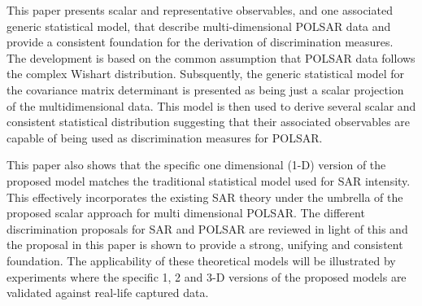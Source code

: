 \documentclass[printer]{tRSL2e}
\begin{document}
This paper presents scalar and representative observables,
  and one associated generic statistical model,
  that describe multi-dimensional POLSAR data and provide a consistent foundation for the derivation of discrimination measures.
The development is based on the common assumption that POLSAR data follows the complex Wishart distribution.  
Subsquently, the generic statistical model for the covariance matrix determinant is presented as being just a scalar projection of the multidimensional data.
This model is then used to derive several scalar and consistent statistical distribution suggesting that their associated observables are capable of being used as discrimination measures for POLSAR.
%

This paper also shows that %
  the specific one dimensional (1-D) version of the proposed  model 
  matches %
  the traditional statistical model used for SAR intensity.
This effectively incorporates the existing SAR theory under the umbrella of the proposed scalar approach for multi dimensional POLSAR.
The different discrimination proposals for SAR and POLSAR are reviewed in light of this and the  proposal in this paper is shown to provide a strong, unifying and consistent foundation. %
The applicability of these theoretical models will be illustrated by experiments where the specific 1, 2 and 3-D versions of the proposed models are validated against real-life captured data. 
\end{document}
